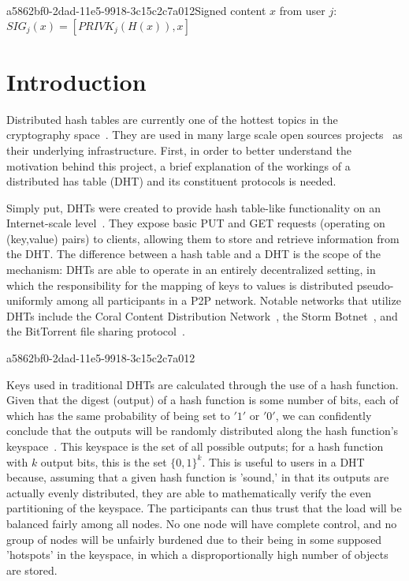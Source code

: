 \documentclass[12pt]{article}
\begin{document}
a5862bf0-2dad-11e5-9918-3c15c2c7a012Signed content $x$ from user $j$: $SIG_j(x) = \left[ PRIVK_j( H(x) ), x \right]$

\section{Introduction}
\par Distributed hash tables are currently one of the hottest topics in the cryptography space~\cite{Stoica:2001dj,Rowstron:2001ea,Ratnasamy:2001wn}. They are used in many large scale open sources projects~\cite{Freitas:2013tb,Xu:2010vs,Perfitt:2010fh} as their underlying infrastructure. First, in order to better understand the motivation behind this project, a brief explanation of the workings of a distributed has table (DHT) and its constituent protocols is needed.

\par Simply put, DHTs were created to provide hash table-like functionality on an Internet-scale level~\cite{Ratnasamy:2001wn}. They expose basic PUT and GET requests (operating on (key,value) pairs) to clients, allowing them to store and retrieve information from the DHT. The difference between a hash table and a DHT is the scope of the mechanism: DHTs are able to operate in an entirely decentralized setting, in which the responsibility for the mapping of keys to values is distributed pseudo-uniformly among all participants in a P2P network. Notable networks that utilize DHTs include the Coral Content Distribution Network~\cite{Freedman:2004vb}, the Storm Botnet~\cite{Holz:2008uk}, and the BitTorrent file sharing protocol~\cite{Cohen:y1_8mBnw}.

a5862bf0-2dad-11e5-9918-3c15c2c7a012\par Keys used in traditional DHTs are calculated through the use of a hash function. Given that the digest (output) of a hash function is some number of bits, each of which has the same probability of being set to $'1'$ or $'0'$, we can confidently conclude that the outputs will be randomly distributed along the hash function's keyspace~. This keyspace is the set of all possible outputs; for a hash function with $k$ output bits, this is the set $\{0,1\}^k$. This is useful to users in a DHT because, assuming that a given hash function is 'sound,' in that its outputs are actually evenly distributed, they are able to mathematically verify the even partitioning of the keyspace. The participants can thus trust that the load will be balanced fairly among all nodes. No one node will have complete control, and no group of nodes will be unfairly burdened due to their being in some supposed 'hotspots' in the keyspace, in which a disproportionally high number of objects are stored.~
\end{document}

